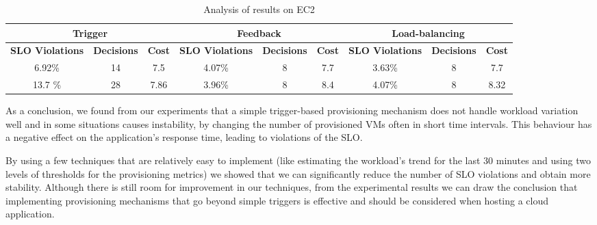 \begin{table}\label{summaryEC2}
  {\scriptsize 
\begin{center}
    \begin{tabular}{  | c | c | c | c | c | c | c | c | c |}
    \hline
    \multicolumn{3}{|c|}{ \textbf{Trigger}  } & \multicolumn{3}{|c|}{ \textbf{Feedback} }&  \multicolumn{3}{c|}{ \textbf{Load-balancing}  }   \\ \hline 
 \textbf{SLO Violations}& \textbf{Decisions} & \textbf{Cost} & \textbf{SLO Violations} & \textbf{Decisions} & \textbf{Cost} & \textbf{SLO Violations} & \textbf{Decisions} & \textbf{Cost} \\ \hline
  6.92\% & 14 & 7.5 &  4.07\%  & 8 & 7.7 &  3.63\% & 8 & 7.7  \\ \hline
  13.7 \% & 28 & 7.86 &  3.96\%  & 8 & 8.4 &  4.07\% & 8 & 8.32  \\ \hline
 \end{tabular}
\end{center}
\vspace{-5mm}
\caption{Analysis of results on EC2}
}
\end{table}




As a conclusion, we found from our experiments that a simple trigger-based
provisioning mechanism does not handle workload variation well and
in some situations causes instability, by changing the number of
provisioned VMs often in short time intervals. This behaviour has a 
negative effect on the application's response time, leading to violations
of the SLO.

By using a few techniques that are relatively easy to implement (like
estimating the workload's trend for the last 30 minutes and using
two levels of thresholds for the provisioning metrics) we showed that
we can significantly reduce the number of SLO violations and
obtain more stability. Although there is still room for improvement
in our techniques, from the experimental results we can draw the
conclusion that implementing provisioning mechanisms that go
beyond simple triggers is effective and should be considered
when hosting a cloud application.

